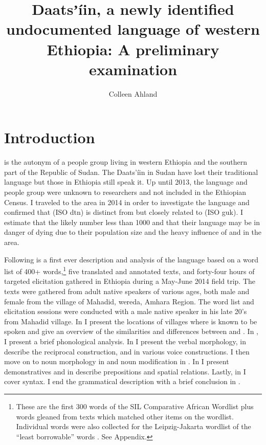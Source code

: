 \documentclass[output=paper]{langsci/langscibook}
\title{Daatsʼíin, a newly identified undocumented language of western Ethiopia: A preliminary examination}
\author{%
 Colleen Ahland \affiliation{SIL International} 
}
\begin{document}

\section{Introduction}\label{sec:ahlandc:1}

 is the autonym of a people group living in western Ethiopia and the southern part of the Republic of Sudan. The Daats’íin in Sudan have lost their traditional language but those in Ethiopia still speak it. Up until 2013, the language and people group were unknown to researchers and not included in the Ethiopian Census. I traveled to the area in 2014 in order to investigate the language and confirmed that  (ISO dtn) is distinct from but closely related to  (ISO guk). I estimate that the  likely number less than 1000 and that their language may be in danger of dying due to their population size and the heavy influence of  and  in the area.

\largerpage
Following is a first ever description and analysis of the  language based on a word list of 400+ words,\footnote{These are the first 300 words of the SIL Comparative African Wordlist \citep{SniderRoberts2006} plus words gleaned from texts which matched other items on the wordlist. Individual words were also collected for the Leipzig-Jakarta wordlist of the “least borrowable” words \citep{HaspelmathTadmor2009}. See Appendix.} five translated and annotated texts, and forty-four hours of targeted elicitation gathered in Ethiopia during a May-June 2014 field trip. The texts were gathered from  adult native speakers of various ages, both male and female from the village of Mahadid,  wereda, Amhara Region. The word list and elicitation sessions were conducted with a male native speaker in his late 20’s from Mahadid village. In  I present the locations of villages where  is known to be spoken and give an overview of the similarities and differences between  and . In , I present a brief phonological analysis. In  I present the verbal morphology, in  describe the reciprocal construction, and in  various voice constructions. I then move on to noun morphology in  and noun modification in . In  I present demonstratives and in  describe prepositions and spatial relations. Lastly, in  I cover syntax. I end the grammatical description with a brief conclusion in .
\end{document}
